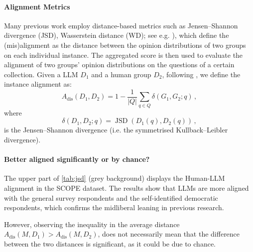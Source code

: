 



\label{app:instance_level}



% 

\paragraph{Alignment Metrics}
Many previous work employ distance-based metrics \cite{santurkar2023whose} such as Jensen--Shannon divergence (JSD), Wasserstein distance (WD); see e.g. \cite{manning1999foundations}), which define the (mis)alignment as the distance between the opinion distributions of two groups on each individual instance. The aggregated score is then used to evaluate the alignment of two groups’ opinion distributions on the questions of a certain collection. Given a LLM $D_{1}$ and a human group $D_{2}$, following \cite{santurkar2023whose}, we define the instance alignment as:
\begin{equation}\label{egAINS}
A_\mathrm{dis}\left(D_1, D_2\right)= 1- \frac{1}{|Q|} \sum_{q \in Q}\delta\left(G_1, G_2;q\right)\, ,
\end{equation}
where
\begin{equation}
  \delta\left(D_1, D_2;q\right) = \operatorname{JSD}\left(D_1(q), D_2(q)\right)\, ,
\end{equation}
is the Jensen--Shannon divergence (i.e. the symmetrised Kullback–Leibler divergence).




\paragraph{Better aligned significantly or by chance?}

The upper part of \autoref{tab:jsd} (grey background) displays the Human-LLM alignment in the SCOPE dataset. The results show that LLMs are more aligned with the general survey respondents and the self-identified democratic respondents, which confirms the midliberal leaning in previous research. 


However, observing the inequality in the average distance $A_\mathrm{dis}(M, D_1)>A_\mathrm{dis}(M, D_2)$, does not necessarily mean that the difference between the two distances is significant, as it could be due to chance.
